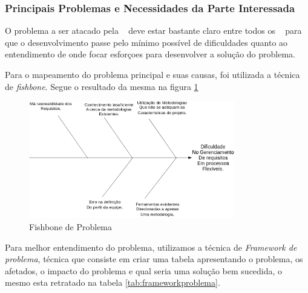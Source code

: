\subsubsection{Principais Problemas e Necessidades da Parte Interessada}

O problema a ser atacado pela \nomeferramenta~ deve estar bastante claro entre todos os \stakeholder~ para que o desenvolvimento passe pelo mínimo possível de dificuldades quanto ao entendimento de onde focar esforçoes para desenvolver a solução do problema.

Para o mapeamento do problema principal e suas causas, foi utilizada a técnica de \textit{fishbone}. Segue o resultado da mesma na figura \ref{img:fishbone}

\begin{figure}[H]
	\centering
	\includegraphics[width=0.8\textwidth]{conteudo/fishbone}
	\caption{Fishbone de Problema}
	\label{img:fishbone}
\end{figure}

Para melhor entendimento do problema, utilizamos a técnica de \textit{Framework de problema}, técnica que consiste em criar uma tabela apresentando o problema, os afetados, o impacto do problema e qual seria uma solução bem sucedida, o mesmo esta retratado na tabela \ref{tab:frameworkproblema}.

